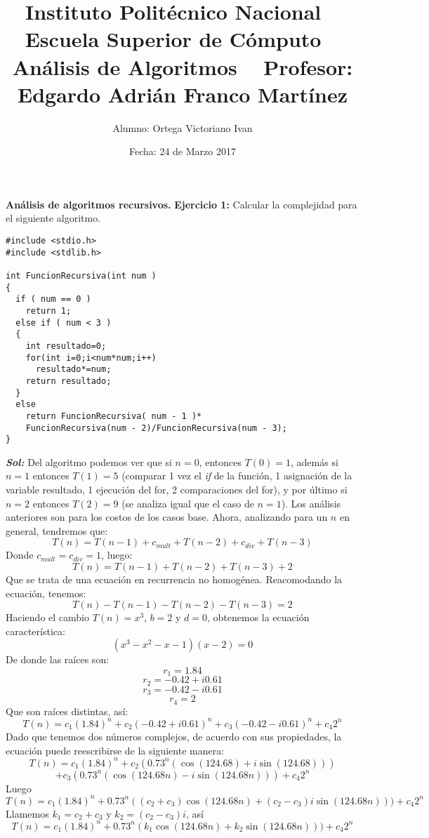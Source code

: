 \documentclass[12pt, letterpaper, twoside]{article}
\title{\textbf{Instituto Politécnico Nacional
			\vspace{10mm}	 \ \newline	
			Escuela Superior de Cómputo}
			\vspace{10mm}	 \ \newline	
			Análisis de Algoritmos
			\vspace{10mm}	 \ \newline	
			Profesor: Edgardo Adrián Franco Martínez}
\author{Alumno: Ortega Victoriano Ivan}
\date{Fecha: 24 de Marzo 2017}
\begin{document}
\begin{titlepage}
\maketitle
\end{titlepage}
\justify
\textbf{Análisis de algoritmos recursivos.}\newline
\textbf{Ejercicio 1:} Calcular la complejidad para el siguiente algoritmo. 
\begin{lstlisting}
#include <stdio.h>
#include <stdlib.h>

int FuncionRecursiva(int num )
{
  if ( num == 0 )
    return 1;
  else if ( num < 3 )
  {
    int resultado=0;
    for(int i=0;i<num*num;i++)
      resultado*=num;
    return resultado;
  }
  else
    return FuncionRecursiva( num - 1 )*
    FuncionRecursiva(num - 2)/FuncionRecursiva(num - 3);
}
\end{lstlisting}
\justify
\textbf{\textit{Sol:}}
Del algoritmo podemos ver que si $n = 0$, entonces $T(0) = 1$, además si $n = 1$ entonces $T(1) = 5$ (comparar 1 vez el \textit{if} de la función, 1 asignación de la variable resultado, 1 ejecución del for, 2 comparaciones del for), y por último si $n = 2$ entonces $T(2) = 9$ (se analiza igual que el caso de $n = 1$). Los análisis anteriores son para los costos de los casos base.
\newline
Ahora, analizando para un $n$ en general, tendremos que:
\[T(n) = T(n-1)+c_{mult}+T(n-2)+c_{div}+T(n-3)\]
Donde $c_{mult}=c_{div}=1$, luego:
\[T(n) = T(n-1)+T(n-2)+T(n-3)+2\]
Que se trata de una ecuación en recurrencia no homogénea.
\newline
Reacomodando la ecuación, tenemos:
\[T(n)-T(n-1)-T(n-2)-T(n-3)=2\]
Haciendo el cambio $T(n) = x^{3}$, $b = 2$ y $d = 0$, obtenemos la ecuación característica:
\[(x^{3}-x^{2}-x-1)(x-2)=0\]
De donde las raíces son:
\[r_{1}=1.84\]
\[r_{2}=-0.42+i0.61\]
\[r_{3}=-0.42-i0.61\]
\[r_{4}=2\]
Que son raíces distintas, así:
\[T(n)=c_{1}(1.84)^{n}+c_{2}(-0.42+i0.61)^{n}+c_{3}(-0.42-i0.61)^{n}+c_{4}2^{n}\]
\justify
Dado que tenemos dos números complejos, de acuerdo con sus propiedades, la ecuación puede reescribirse de la siguiente manera:
\[T(n)=c_{1}(1.84)^{n}+c_{2}(0.73^{n}(\cos(124.68)+i\sin(124.68)))\]
\[+c_{3}(0.73^{n}(\cos(124.68n)-i\sin(124.68n)))+c_{4}2^{n}\]
Luego
\[T(n)=c_{1}(1.84)^{n}+0.73^{n}((c_{2}+c_{3})\cos(124.68n)+(c_{2}-c_{3})i\sin(124.68n)))+c_{4}2^{n}\]
Llamemos $k_{1}=c_{2}+c_{3}$ y $k_{2}=(c_{2}-c_{3})i$, así
\[T(n)=c_{1}(1.84)^{n}+0.73^{n}(k_{1}\cos(124.68n)+k_{2}\sin(124.68n)))+c_{4}2^{n}\]
\end{document}
